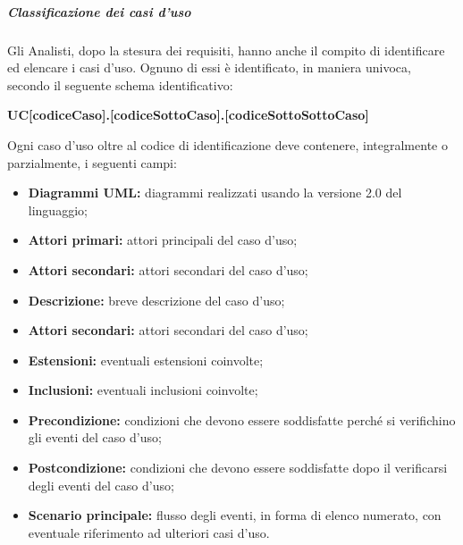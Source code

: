 				\subparagraph{Classificazione dei casi d'uso}
					Gli Analisti, dopo la stesura dei requisiti, hanno anche il compito di identificare ed elencare i casi d’uso. Ognuno di essi è identificato, in maniera univoca, secondo il seguente schema identificativo:
					\begin{center}
						\textbf{UC[codiceCaso].[codiceSottoCaso].[codiceSottoSottoCaso]}
					\end{center}
					Ogni caso d'uso oltre al codice di identificazione deve contenere, integralmente o parzialmente, i seguenti campi:
					\begin{itemize}
						\item \textbf{Diagrammi UML:} diagrammi realizzati usando la versione 2.0 del linguaggio;
						\item \textbf{Attori primari:} attori principali del caso d’uso; 
						\item \textbf{Attori secondari:} attori secondari del caso d’uso;
						\item \textbf{Descrizione:} breve descrizione del caso d'uso;
						\item \textbf{Attori secondari:} attori secondari del caso d’uso;
						\item \textbf{Estensioni:} eventuali estensioni coinvolte;
						\item \textbf{Inclusioni:} eventuali inclusioni coinvolte;
						\item \textbf{Precondizione:} condizioni che devono essere soddisfatte perché si verifichino gli eventi del caso d’uso;
						\item \textbf{Postcondizione:} condizioni che devono essere soddisfatte dopo il verificarsi degli eventi del caso d’uso;
						\item \textbf{Scenario principale:} flusso degli eventi, in forma di elenco numerato, con eventuale riferimento ad ulteriori casi d’uso.
					\end{itemize}
				
